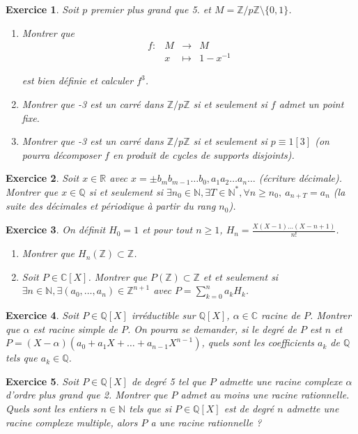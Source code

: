 \documentclass[12pt]{article}
\newtheorem{exercise}{Exercice}[section]
\theoremstyle{remark}
\theoremstyle{remark}
\newcommand{\R}{\mathbb{R}}
\newcommand{\C}{\mathbb{C}}
\newcommand{\Q}{\mathbb{Q}}
\newcommand{\N}{\mathbb{N}}
\newcommand{\Z}{\mathbb{Z}}
\newcommand{\function}[5]{
	$$
	\begin{array}{rccl}
		#1: & #2 & \to & #3 \\
		& #4 & \mapsto & #5
	\end{array}
	$$
}
\begin{document}
\begin{exercise}
	Soit $p$ premier plus grand que 5. et $M=\Z/p\Z\setminus\{0,1\}$.
	\begin{enumerate}
		\item Montrer que \function{f}{M}{M}{x}{1-x^{-1}}
		est bien définie et calculer $f^{3}$.
		\item Montrer que -3 est un carré dans $\Z/p\Z$ si et seulement si $f$
		admet un point fixe.
		\item Montrer que -3 est un carré dans $\Z/p\Z$ si et seulement si
		$p\equiv 1[3]$ (on pourra décomposer $f$ en produit de cycles de
		supports disjoints).
	\end{enumerate}
\end{exercise}

\begin{exercise}
	Soit $x\in\R$ avec $x=\pm b_{m}b_{m-1}\dots b_{0},a_{1}a_{2}\dots a_{n}\dots$
	(écriture décimale). Montrer que $x\in\Q$ si et seulement si $\exists
	n_{0}\in\N,\exists T\in\N^{*},\forall n\geqslant n_{0},~a_{n+T}=a_{n}$ (la
	suite des décimales et périodique à partir du rang $n_{0}$).
\end{exercise}

\begin{exercise}
	On définit $H_{0}=1$ et pour tout $n\geqslant1$,
	$H_{n}=\frac{X(X-1)\dots(X-n+1)}{n!}$.
	\begin{enumerate}
		\item Montrer que $H_{n}(\Z)\subset\Z$.
		\item Soit $P\in\C[X]$. Montrer que $P(\Z)\subset\Z$ et et seulement si
		$\exists n\in\N,\exists(a_{0},\dots,a_{n})\in\Z^{n+1}$ avec $P=\sum_{k=0}^{n}a_{k}H_{k}$.
	\end{enumerate}
\end{exercise}

\begin{exercise}
	Soit $P\in\Q[X]$ irréductible sur $\Q[X]$, $\alpha\in\C$ racine de $P$.
	Montrer que $\alpha$ est racine simple de $P$. On pourra se demander, si le degré de $P$ est $n$ et
	$P=(X-\alpha)(a_{0}+a_{1}X+\dots+a_{n-1}X^{n-1})$, quels sont les
	coefficients $a_{k}$ de $\Q$ tels que $a_{k}\in\Q$.
\end{exercise}

\begin{exercise}
	Soit $P\in\Q[X]$ de degré 5 tel que $P$ admette une racine complexe $\alpha$
	d'ordre plus grand que 2. Montrer que $P$ admet au moins une racine
	rationnelle. Quels sont les entiers $n\in\N$ tels que si $P\in\Q[X]$ est de
	degré $n$ admette une racine complexe multiple, alors $P$ a une racine
	rationnelle ?
\end{exercise}
\end{document}
